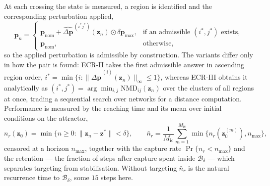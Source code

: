 At each crossing the state is measured, a region is identified and the
corresponding perturbation applied,
%
\begin{equation}
\mathbf{p}_n=
\begin{cases}
\mathbf{p}_{\mathrm{nom}}+\widehat{\Delta\mathbf{p}}^{\,(i^{*}j^{*})}(\mathbf{z}_n)\odot\delta\mathbf{p}_{\max},
& \text{if an admissible } (i^{*},j^{*}) \text{ exists},\\
\mathbf{p}_{\mathrm{nom}}, & \text{otherwise},
\end{cases}
\label{eq:control-law}
\end{equation}
%
so the applied perturbation is admissible by construction. The variants differ
only in how the pair is found: ECR-II takes the first admissible answer in
ascending region order,
$i^{*}=\min\{i:\|\widehat{\Delta\mathbf{p}}^{\,(i)}(\mathbf{z}_n)\|_{\infty}\le1\}$,
whereas ECR-III obtains it analytically as
$(i^{*},j^{*})=\arg\min_{i,j}\mathrm{NMD}_{ij}(\mathbf{z}_n)$ over the clusters
of all regions at once, trading a sequential search over networks for a
distance computation. Performance is measured by the reaching time and its mean
over initial conditions on the attractor,
%
\begin{equation}
n_r(\mathbf{z}_0)=\min\bigl\{n\ge0:\|\mathbf{z}_n-\mathbf{z}^{*}\|<\delta\bigr\},
\qquad
\bar{n}_r=\frac{1}{M_{\mathrm{ic}}}\sum_{m=1}^{M_{\mathrm{ic}}}
\min\bigl\{n_r(\mathbf{z}_0^{(m)}),n_{\max}\bigr\},
\label{eq:reaching-time}
\end{equation}
%
censored at a horizon $n_{\max}$, together with the capture rate
$\Pr\{n_r<n_{\max}\}$ and the retention --- the fraction of steps after capture
spent inside $\mathcal{B}_\delta$ --- which separates targeting from
stabilisation. Without targeting $\bar{n}_r$ is the natural recurrence time to
$\mathcal{B}_\delta$, some $15$ steps here.
